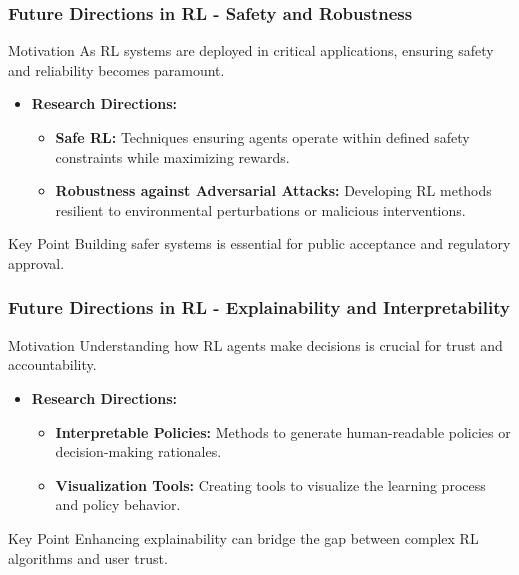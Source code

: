 \documentclass[aspectratio=169]{beamer}
\begin{document}
\begin{frame}[fragile]
    \frametitle{Future Directions in RL - Safety and Robustness}
    \begin{block}{Motivation}
        As RL systems are deployed in critical applications, ensuring safety and reliability becomes paramount.
    \end{block}
    \begin{itemize}
        \item \textbf{Research Directions:}
            \begin{itemize}
                \item \textbf{Safe RL:} Techniques ensuring agents operate within defined safety constraints while maximizing rewards.
                \item \textbf{Robustness against Adversarial Attacks:} Developing RL methods resilient to environmental perturbations or malicious interventions.
            \end{itemize}
    \end{itemize}
    \begin{block}{Key Point}
        Building safer systems is essential for public acceptance and regulatory approval.
    \end{block}
\end{frame}

\begin{frame}[fragile]
    \frametitle{Future Directions in RL - Explainability and Interpretability}
    \begin{block}{Motivation}
        Understanding how RL agents make decisions is crucial for trust and accountability.
    \end{block}
    \begin{itemize}
        \item \textbf{Research Directions:}
            \begin{itemize}
                \item \textbf{Interpretable Policies:} Methods to generate human-readable policies or decision-making rationales.
                \item \textbf{Visualization Tools:} Creating tools to visualize the learning process and policy behavior.
            \end{itemize}
    \end{itemize}
    \begin{block}{Key Point}
        Enhancing explainability can bridge the gap between complex RL algorithms and user trust.
    \end{block}
\end{frame}
\end{document}
